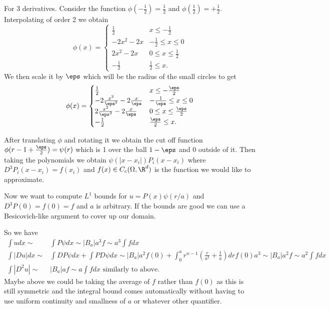 For $3$ derivatives. Consider the function $\phi(-\frac{1}{2})=\frac{1}{2}$ and $\phi(\frac{1}{2})=+\frac{1}{2}$. Interpolating of order 2 we obtain
\begin{equation}
\phi(x) = \begin{cases}
\frac{1}{2} & x\leq -\frac{1}{2} \\
-2x^2 - 2x & -\frac{1}{2} \leq x\leq 0 \\
2x^2 -2x & 0 \leq x \leq \frac{1}{2} \\
- \frac{1}{2} & \frac{1}{2} \leq x.
\end{cases}
\end{equation}
We then scale it by $\eps$ which will be the radius of the small circles to get
\begin{equation}
\phi(x) = \begin{cases}
\frac{1}{2} & x\leq -\frac{\eps}{2} \\
-2 \frac{x^2}{\eps^2} - 2\frac{x}{\eps} & -\frac{1}{\eps} \leq x\leq 0 \\
2 \frac{x^2}{\eps^2} -2\frac{x}{\eps} & 0 \leq x \leq \frac{\eps}{2} \\
- \frac{1}{2} & \frac{\eps}{2} \leq x.
\end{cases}
\end{equation}

After translating $\phi$ and rotating it we obtain the cut off function $\phi(r-1+\frac{\eps}{2}) = \psi(r)$ which is 1 over the ball $1-\eps$ and $0$ outside of it. Then taking the polynomials we obtain $\psi(|x-x_i|) P_i(x-x_i)$ where $D^3P_i(x-x_i) = f(x_i)$ and $f(x)\in C_c(\Omega,\R^d)$ is the function we would like to approximate.

Now we want to compute $L^1$ bounds for $u = P(x) \psi(r/a)$ and $D^3 P (0) = f(0) = f$ and $a$ is arbitrary. If the bounds are good we can use a Besicovich-like argument to cover up our domain.

So we have
\begin{align}
\int u dx \sim & \int P \psi dx \sim |B_a| a^3 f \sim a^3 \int fdx \\
\int |Du|dx \sim & \int DP \psi dx + \int P D\psi dx \sim |B_a| a^2 f(0) + \int_0^a r^{n-1} (\frac{r}{a^2} + \frac{1}{a}) dr f(0) a^3 \sim |B_a| a^2 f \sim a^2 \int fdx \\
\int |D^2 u| \sim & |B_a| a f \sim a \int fdx \text{ similarly to above}.
\end{align}
Maybe above we could be taking the average of $f$ rather than $f(0)$ as this is still symmetric and the integral bound comes automatically without having to use uniform continuity and smallness of $a$ or whatever other quantifier.

